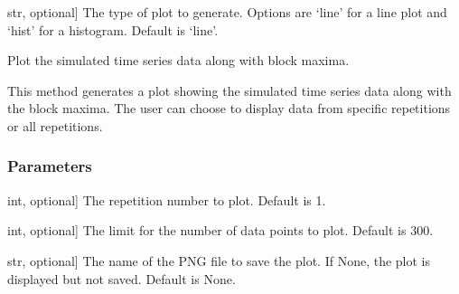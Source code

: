 \documentclass[a4paper,11pt,openany,english]{sphinxmanual}
\begin{document}
\begin{fulllineitems}
\begin{fulllineitems}
\begin{description}
\sphinxlineitem{plot\_type}{[}str, optional{]}
\sphinxAtStartPar
The type of plot to generate. Options are ‘line’ for a line plot and ‘hist’ for a histogram. Default is ‘line’.

\end{description}

\end{fulllineitems}


\begin{fulllineitems}
\label{\detokenize{api_topt:xtremes.topt.TimeSeries.plot_with_blockmaxima}}
\pysigstartsignatures
{}
\pysigstopsignatures
\sphinxAtStartPar
Plot the simulated time series data along with block maxima.

\sphinxAtStartPar
This method generates a plot showing the simulated time series data along with the block maxima. 
The user can choose to display data from specific repetitions or all repetitions.


\subsubsection{Parameters}
\label{\detokenize{api_topt:id5}}\begin{description}
\sphinxlineitem{rep}{[}int, optional{]}
\sphinxAtStartPar
The repetition number to plot. Default is 1.

\sphinxlineitem{plotlim}{[}int, optional{]}
\sphinxAtStartPar
The limit for the number of data points to plot. Default is 300.

\sphinxlineitem{filename}{[}str, optional{]}
\sphinxAtStartPar
The name of the PNG file to save the plot. If None, the plot is displayed but not saved. Default is None.

\end{description}

\end{fulllineitems}



\end{fulllineitems}
\end{document}
